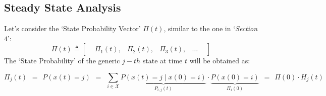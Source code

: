 \documentclass[12pt,a4paper]{article}
\begin{document}
\subsection{Steady State Analysis}
Let's consider the `State Probability Vector' $\Pi(t)$, similar to the one in `\emph{Section $4$}':
$$
\Pi(t)\triangleq \left[
\begin{matrix}
&\Pi_1(t),& \Pi_2(t),& \Pi_3(t),& \dots&
\end{matrix}
\right]
$$ 
The `State Probability' of the generic $j-th$ state at time $t$ will be obtained as:

$$
\Pi_j\left(t\right)\hspace{5pt}=\hspace{5pt} P\left(x\left(t\right)=j\right)
\hspace{5pt}=\hspace{5pt} 
\sum_{i\in\mathcal{X}}{
\underbrace{
P\left( x \left( t \right) = j  \mid   x\left(0\right)=i\right)
}_{P_{i,j}(t)}
\cdot
\underbrace{
P\left(x\left(0\right)=i\right)
}_{\Pi_i(0)}
}\hspace{5pt}=\hspace{5pt}
\Pi(0)\cdot H_j(t)
$$
\end{document}

